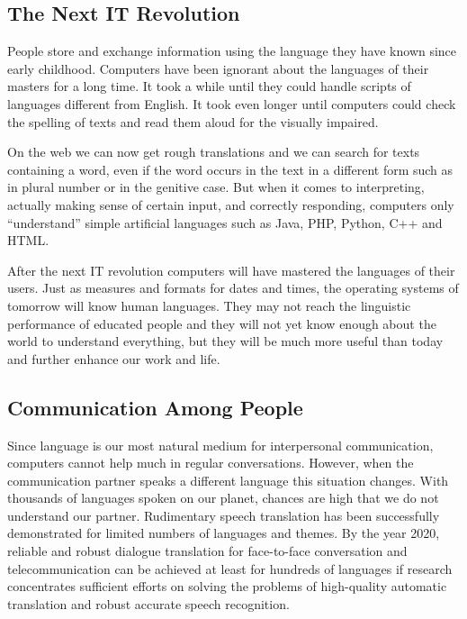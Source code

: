\documentclass[10pt, plain]{../../metanetpaper}
\begin{document}
\begin{multicols}{2}
\subsection{The Next IT Revolution}
\label{sec:introduction-vision}

People store and exchange information using the language they have known since early childhood. Computers have been ignorant about the languages of their masters for a long time. It took a while until they could handle scripts of languages different from English. It took even longer until computers could check the spelling of texts and read them aloud for the visually impaired.
 
On the web we can now get rough translations and we can search for texts containing a word, even if the word occurs in the text in a different form such as in plural number or in the genitive case. But when it comes to interpreting, actually making sense of certain input, and correctly responding, computers only “understand” simple artificial languages such as Java, PHP, Python, C++ and HTML.
 
After the next IT revolution computers will have mastered the languages of their users. Just as measures and formats for dates and times, the operating systems of tomorrow will know human languages. They may not reach the linguistic performance of educated people and they will not yet know enough about the world to understand everything, but they will be much more useful than today and further enhance our work and life.

\subsection{Communication Among People}
\label{sec:comm-among-people}

Since language is our most natural medium for interpersonal communication, computers cannot help much in regular conversations. However, when the communication partner speaks a different language this situation changes. With thousands of languages spoken on our planet, chances are high that we do not understand our partner. Rudimentary speech translation has been successfully demonstrated for limited numbers of languages and themes. By the year 2020, reliable and robust dialogue translation for face-to-face conversation and telecommunication can be achieved at least for hundreds of languages if research concentrates sufficient efforts on solving the problems of high-quality automatic translation and robust accurate speech recognition. 


\end{multicols}
\end{document}
